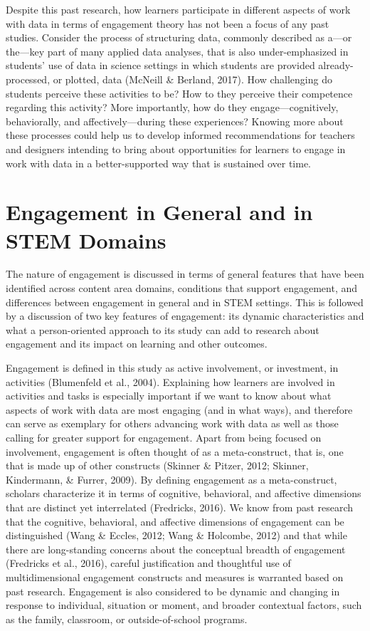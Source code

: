 \documentclass[]{msu-thesis}
\theoremstyle{definition}
\theoremstyle{definition}
\theoremstyle{definition}
\theoremstyle{remark}
\begin{document}
Despite this past research, how learners participate in different
aspects of work with data in terms of engagement theory has not been a
focus of any past studies. Consider the process of structuring data,
commonly described as a---or the---key part of many applied data
analyses, that is also under-emphasized in students' use of data in
science settings in which students are provided already-processed, or
plotted, data (McNeill \& Berland, 2017). How challenging do students
perceive these activities to be? How to they perceive their competence
regarding this activity? More importantly, how do they
engage---cognitively, behaviorally, and affectively---during these
experiences? Knowing more about these processes could help us to develop
informed recommendations for teachers and designers intending to bring
about opportunities for learners to engage in work with data in a
better-supported way that is sustained over time.

\section{Engagement in General and in STEM
Domains}\label{engagement-in-general-and-in-stem-domains}

The nature of engagement is discussed in terms of general features that
have been identified across content area domains, conditions that
support engagement, and differences between engagement in general and in
STEM settings. This is followed by a discussion of two key features of
engagement: its dynamic characteristics and what a person-oriented
approach to its study can add to research about engagement and its
impact on learning and other outcomes.

Engagement is defined in this study as active involvement, or
investment, in activities (Blumenfeld et al., 2004). Explaining how
learners are involved in activities and tasks is especially important if
we want to know about what aspects of work with data are most engaging
(and in what ways), and therefore can serve as exemplary for others
advancing work with data as well as those calling for greater support
for engagement. Apart from being focused on involvement, engagement is
often thought of as a meta-construct, that is, one that is made up of
other constructs (Skinner \& Pitzer, 2012; Skinner, Kindermann, \&
Furrer, 2009). By defining engagement as a meta-construct, scholars
characterize it in terms of cognitive, behavioral, and affective
dimensions that are distinct yet interrelated (Fredricks, 2016). We know
from past research that the cognitive, behavioral, and affective
dimensions of engagement can be distinguished (Wang \& Eccles, 2012;
Wang \& Holcombe, 2012) and that while there are long-standing concerns
about the conceptual breadth of engagement (Fredricks et al., 2016),
careful justification and thoughtful use of multidimensional engagement
constructs and measures is warranted based on past research. Engagement
is also considered to be dynamic and changing in response to individual,
situation or moment, and broader contextual factors, such as the family,
classroom, or outside-of-school programs.
\end{document}
